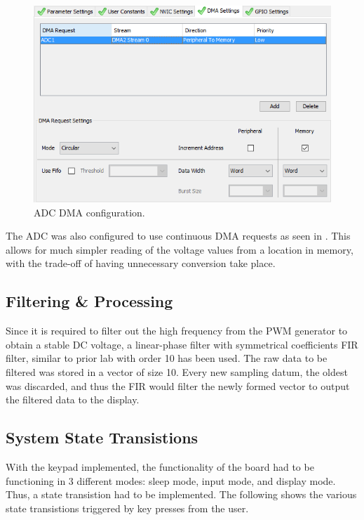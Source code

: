 \documentclass[a4paper,titlepage]{article}
\begin{document}
\begin{figure}[!htb]
  \centering
  \includegraphics[width=\columnwidth]{figures/adc_config_dma.png}
  \caption{ADC DMA configuration.}
  \label{fig:adc_config_dma}
\end{figure}

The ADC was also configured to use continuous DMA requests as seen in . This allows for much simpler reading of the voltage values from a location in memory, with the trade-off of having unnecessary conversion take place.


\subsection{Filtering \& Processing}

Since it is required to filter out the high frequency from the PWM generator to obtain a stable DC voltage, a linear-phase filter with symmetrical coefficients FIR filter, similar to prior lab with order 10 has been used. The raw data to be filtered was stored in a vector of size 10. Every new sampling datum, the oldest was discarded, and thus the FIR would filter the newly formed vector to output the filtered data to the display.

\subsection{System State Transistions}
With the keypad implemented, the functionality of the board had to be functioning in 3 different modes: sleep mode, input mode, and display mode. Thus, a state transistion had to be implemented. The following  shows the various state transistions triggered by key presses from the user.
\end{document}
